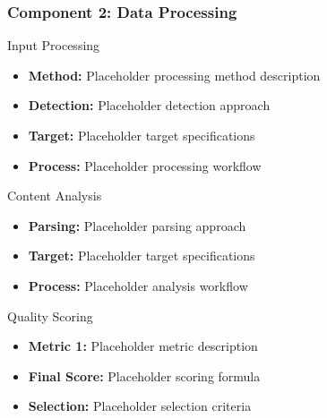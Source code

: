 \begin{frame}
\frametitle{Component 2: Data Processing}
\begin{block}{Input Processing}
\begin{itemize}
\item \textbf{Method:} Placeholder processing method description
\item \textbf{Detection:} Placeholder detection approach
\item \textbf{Target:} Placeholder target specifications
\item \textbf{Process:} Placeholder processing workflow
\end{itemize}
\end{block}

\begin{block}{Content Analysis}
\begin{itemize}
\item \textbf{Parsing:} Placeholder parsing approach
\item \textbf{Target:} Placeholder target specifications
\item \textbf{Process:} Placeholder analysis workflow
\end{itemize}
\end{block}

\begin{block}{Quality Scoring}
\begin{itemize}
\item \textbf{Metric 1:} Placeholder metric description
\item \textbf{Final Score:} Placeholder scoring formula
\item \textbf{Selection:} Placeholder selection criteria
\end{itemize}
\end{block}
\end{frame}

